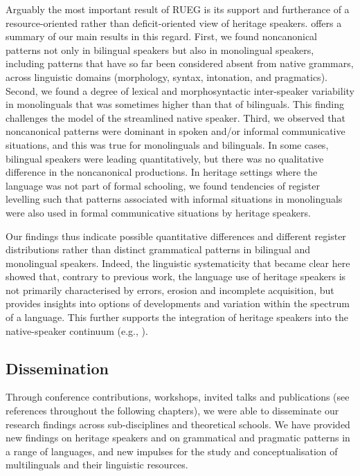 \documentclass[output=paper,colorlinks,citecolor=brown]{langscibook}
\begin{document}
Arguably the most important result of RUEG is its support and furtherance of a resource\hyp oriented rather than deficit\hyp oriented view of heritage speakers. \citet{WieseEtAl2022} offers a summary of our main results in this regard. First, we found noncanonical patterns not only in bilingual speakers but also in monolingual speakers, including patterns that have so far been considered absent from native grammars, across linguistic domains (morphology, syntax, intonation, and pragmatics). Second, we found a degree of lexical and morphosyntactic inter\hyp speaker variability in monolinguals that was sometimes higher than that of bilinguals. This finding challenges the model of the streamlined native speaker. Third, we observed that noncanonical patterns were dominant in spoken and/or informal communicative situations, and this was true for monolinguals and bilinguals. In some cases, bilingual speakers were leading quantitatively, but there was no qualitative difference in the noncanonical productions. In heritage settings where the language was not part of formal schooling, we found tendencies of register levelling such that patterns associated with informal situations in monolinguals were also used in formal communicative situations by heritage speakers. 

\begin{sloppypar}
Our findings thus indicate possible quantitative differences and different register distributions rather than distinct grammatical patterns in bilingual and monolingual speakers. Indeed, the linguistic systematicity that became clear here showed that, contrary to previous work, the language use of heritage speakers is not primarily characterised by errors, erosion and incomplete acquisition, but provides insights into options of developments and variation within the spectrum of a language. This further supports the integration of heritage speakers into the native-speaker continuum (e.g., \citealt{TsehayeEtAl2021, WieseEtAl2022}).
\end{sloppypar}

\subsection{Dissemination} \label{sec:introwieseetal:dissemination}

Through conference contributions, workshops, invited talks and publications (see references throughout the following chapters), we were able to disseminate our research findings across sub-disciplines and theoretical schools. We have provided new findings on heritage speakers and on grammatical and pragmatic patterns in a range of languages, and new impulses for the study and conceptualisation of multilinguals and their linguistic resources. 
\end{document}
